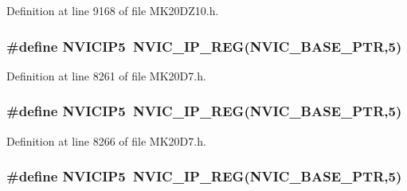 Definition at line 9168 of file M\+K20\+D\+Z10.\+h.

\subsubsection[{\texorpdfstring{N\+V\+I\+C\+I\+P5}{NVICIP5}}]{\setlength{\rightskip}{0pt plus 5cm}\#define N\+V\+I\+C\+I\+P5~{\bf N\+V\+I\+C\+\_\+\+I\+P\+\_\+\+R\+EG}({\bf N\+V\+I\+C\+\_\+\+B\+A\+S\+E\+\_\+\+P\+TR},5)}\hypertarget{group___n_v_i_c___register___accessor___macros_gaa39b21b56b3fc075997621d95106255d}{}\label{group___n_v_i_c___register___accessor___macros_gaa39b21b56b3fc075997621d95106255d}


Definition at line 8261 of file M\+K20\+D7.\+h.

\subsubsection[{\texorpdfstring{N\+V\+I\+C\+I\+P5}{NVICIP5}}]{\setlength{\rightskip}{0pt plus 5cm}\#define N\+V\+I\+C\+I\+P5~{\bf N\+V\+I\+C\+\_\+\+I\+P\+\_\+\+R\+EG}({\bf N\+V\+I\+C\+\_\+\+B\+A\+S\+E\+\_\+\+P\+TR},5)}\hypertarget{group___n_v_i_c___register___accessor___macros_gaa39b21b56b3fc075997621d95106255d}{}\label{group___n_v_i_c___register___accessor___macros_gaa39b21b56b3fc075997621d95106255d}


Definition at line 8266 of file M\+K20\+D7.\+h.

\subsubsection[{\texorpdfstring{N\+V\+I\+C\+I\+P5}{NVICIP5}}]{\setlength{\rightskip}{0pt plus 5cm}\#define N\+V\+I\+C\+I\+P5~{\bf N\+V\+I\+C\+\_\+\+I\+P\+\_\+\+R\+EG}({\bf N\+V\+I\+C\+\_\+\+B\+A\+S\+E\+\_\+\+P\+TR},5)}\hypertarget{group___n_v_i_c___register___accessor___macros_gaa39b21b56b3fc075997621d95106255d}{}\label{group___n_v_i_c___register___accessor___macros_gaa39b21b56b3fc075997621d95106255d}


